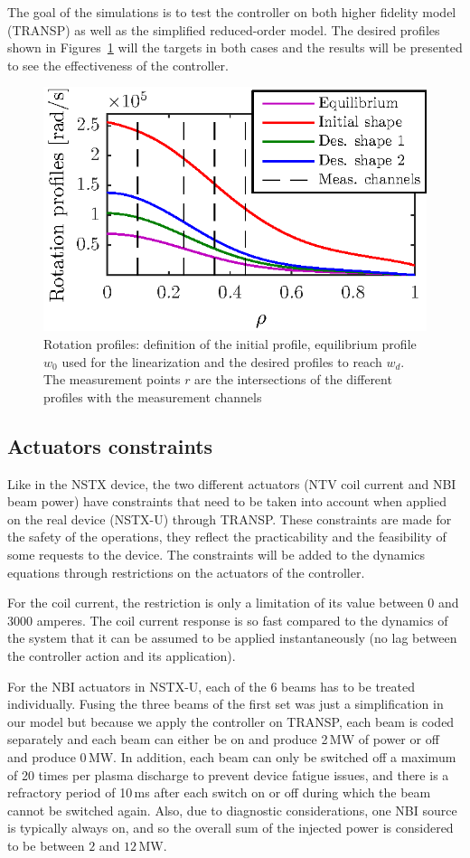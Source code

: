 \documentclass[12pt,lot, lof]{puthesis}
\begin{document}
The goal of the simulations is to test the controller on both higher fidelity model (TRANSP) as well as the simplified reduced-order model.  The desired profiles shown in Figures~\ref{initnstxu} will the targets in both cases and the results will be presented to see the effectiveness of the controller.

\begin{figure}[htbp]
	\centering
	\includegraphics[width=0.7 \linewidth]{chap10/initial}
	\caption{Rotation profiles: definition of the initial profile, equilibrium profile $w_0$ used for the linearization and the desired profiles to reach $w_d$. The measurement points $r$ are the intersections of the different profiles with the measurement channels}
	\label{initnstxu}
\end{figure}

\subsection{Actuators constraints}
\label{constraintsnstxu}
Like in the NSTX device, the two different actuators (NTV coil current and NBI beam power) have constraints that need to be taken into account when applied on the real device (NSTX-U) through TRANSP. These constraints are made for the safety of the operations, they reflect the practicability and the feasibility of some requests to the device. The constraints will be added to the dynamics equations through restrictions on the actuators of the controller.

For the coil current, the restriction is only a limitation of its value between 0 and 3000 amperes.
The coil current response is so fast compared to the dynamics of the system that it can be assumed to be applied instantaneously (no lag between the controller action and its application).

For the NBI actuators in NSTX-U, each of the 6 beams has to be treated individually. Fusing the three beams of the first set was just a simplification in our model but because we apply the controller on TRANSP, each beam is coded separately and each beam can either be on and produce 2\,MW of power or off and produce 0\,MW.
In addition, each beam can only be switched off a maximum of 20 times per plasma discharge to prevent device fatigue issues, and there is a refractory period of 10\,ms after each switch on or off during which the beam cannot be switched again.
Also, due to diagnostic considerations, one NBI source is typically always on, and so the overall sum of the injected power is considered to be between $2$ and $12$\,MW.
\end{document}
